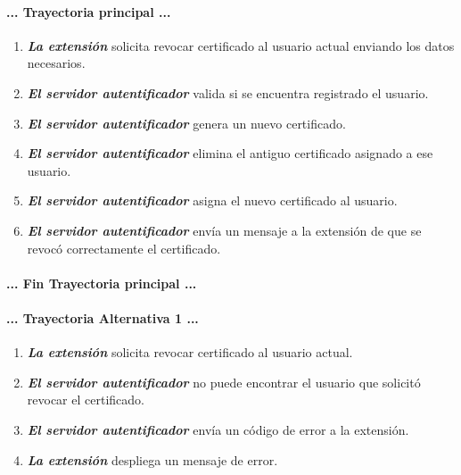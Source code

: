 \documentclass[12pt, a4paper, titlepage]{report}
\begin{document}
    		\paragraph{... Trayectoria principal ...}
    		\begin{enumerate}
    		    \item \textbf{\textit{La extensión}} solicita revocar certificado al usuario actual enviando los datos necesarios.
    		    
    		    \item \textbf{\textit{El servidor autentificador}} valida si se encuentra registrado el usuario.
    		    
    		    \item \textbf{\textit{El servidor autentificador}} genera un nuevo certificado.
    		    
    		    \item \textbf{\textit{El servidor autentificador}} elimina el antiguo certificado asignado a ese usuario.
    		    
    		    \item \textbf{\textit{El servidor autentificador}} asigna el nuevo certificado al usuario.
    		    
    		    \item \textbf{\textit{El servidor autentificador}} envía un mensaje a la extensión de que se revocó correctamente el certificado.
    		\end{enumerate}
    		\paragraph{... Fin Trayectoria principal ...}
    		
    		\paragraph{... Trayectoria Alternativa 1 ...}
    		\begin{enumerate}
    		    \item \textbf{\textit{La extensión}} solicita revocar certificado al usuario actual.
    		    
    		    \item \textbf{\textit{El servidor autentificador}} no puede encontrar el usuario que solicitó revocar el certificado.
    		    
    		    \item \textbf{\textit{El servidor autentificador}} envía un código de error a la extensión.
    		    
    		    \item \textbf{\textit{La extensión}} despliega un mensaje de error.
    		\end{enumerate}
\end{document}
